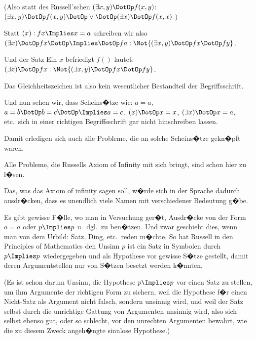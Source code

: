 \begin{propositions}
{(Also statt des Russell'schen \glqq{}$(\exists x,y) \DotOp f(x,y)$\grqq{}:
\glqq{}$(\exists x,y) \DotOp f(x,y) \DotOp \lor \DotOp (\exists x) \DotOp f(x,x)$\grqq{}.)}


{Statt \glqq{}$(x) : fx \Implies x = a$\grqq{} schreiben wir also \zumBeispiel\ \glqq{}$(\exists
x) \DotOp fx \DotOp \Implies \DotOp fa : \Not{(\exists x,y) \DotOp fx \DotOp fy}$\grqq{}.

Und der Satz \glqq{} Ein $x$ befriedigt $f()$\grqq{} lautet:
\glqq{}$(\exists x) \DotOp fx : \Not{(\exists x,y) \DotOp fx \DotOp fy}$\grqq{}.}


{Das Gleichheitszeichen ist also kein wesentlicher
Bestandteil der Begriffsschrift.}


{Und nun sehen wir, dass Scheins�tze wie:
\glqq{}$a = a$\grqq{}, \glqq{}$a = b \DotOp b = c \DotOp \Implies a = c$\grqq{}, \glqq{}$(x) \DotOp x = x$\grqq{}, \glqq{}$(\exists x) \DotOp
x = a$\grqq{}, etc.\ sich in einer richtigen Begriffsschrift gar
nicht hinschreiben lassen.}


{Damit erledigen sich auch alle Probleme, die
an solche Scheins�tze gekn�pft waren.

Alle Probleme, die Russells \glqq{}Axiom of Infinity\grqq{}
\enlargethispage{7pt} %
mit sich bringt, sind schon hier zu l�sen.

Das, was das Axiom of infinity sagen soll, w�rde
sich in der Sprache dadurch ausdr�cken, dass es
unendlich viele Namen mit verschiedener Bedeutung
g�be.}


{Es gibt gewisse F�lle, wo man in Versuchung
ger�t, Ausdr�cke von der Form \glqq{}$a = a$\grqq{} oder \glqq{}$p \Implies p$\grqq{}
u.~dgl.\ zu ben�tzen. Und zwar geschieht dies,
wenn man von dem Urbild: Satz, Ding, etc.\ reden
m�chte. So hat Russell in den \glqq{}Principles of
Mathematics\grqq{} den Unsinn \glqq{}$p$ ist ein Satz\grqq{} in Symbolen
durch \glqq{}$p \Implies p$\grqq{} wiedergegeben und als Hypothese
vor gewisse S�tze gestellt, damit deren
Argumentstellen nur von S�tzen besetzt werden
k�nnten.

(Es ist schon darum Unsinn, die Hypothese
$p \Implies p$ vor einen Satz zu stellen, um ihm Argumente
der richtigen Form zu sichern, weil die Hypothese
f�r einen Nicht-Satz als Argument nicht falsch,
sondern unsinnig wird, und weil der Satz selbst
durch die unrichtige Gattung von Argumenten
unsinnig wird, also sich selbst ebenso gut, oder so
schlecht, vor den unrechten Argumenten bewahrt,
wie die zu diesem Zweck angeh�ngte sinnlose
Hypothese.)}



\end{propositions}
